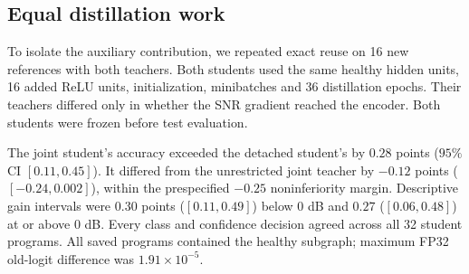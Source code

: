\subsection{Equal distillation work}
\label{app:rml_matched_distillation}

To isolate the auxiliary contribution, we repeated exact reuse on
16 new references with both teachers. Both students used the same
healthy hidden units, 16 added ReLU units, initialization, minibatches
and 36 distillation epochs. Their teachers differed only in whether
the SNR gradient reached the encoder. Both students were frozen before
test evaluation.

The joint student's accuracy exceeded the detached student's by
$0.28$ points ($95\%$ CI $[0.11,0.45]$). It differed from the
unrestricted joint teacher by $-0.12$ points ($[-0.24,0.002]$),
within the prespecified $-0.25$ noninferiority margin. Descriptive
gain intervals were $0.30$ points ($[0.11,0.49]$) below $0$ dB
and $0.27$ ($[0.06,0.48]$) at or above $0$ dB. Every class and
confidence decision agreed across all 32 student programs.
All saved programs contained the healthy subgraph; maximum FP32
old-logit difference was $1.91\times10^{-5}$.
